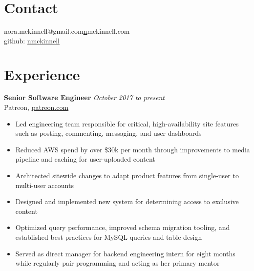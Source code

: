 \documentclass[margin,line]{resume}
\begin{document}
\begin{resume}
\section{\mysidestyle Contact}

nora.mckinnell@gmail.com\hfill \href{http://nmckinnell.com}nmckinnell.com\vspace{0mm}\\\vspace{0mm}%
\hfill github: \href{https://github.com/nmckinnell}{nmckinnell}\vspace{0mm}\\\vspace{-4mm}%
\section{\mysidestyle Experience}

\textbf{Senior Software Engineer} \hfill \textsl{October 2017 to present}\vspace{0mm}\\%
Patreon, \href{http://patreon.com}{patreon.com}\vspace{0mm}\\\vspace{-2mm}%
\begin{itemize}
\item Led engineering team responsible for critical, high-availability site features such as posting, commenting, messaging, and user dashboards
\item Reduced AWS spend by over \$30k per month through improvements to media pipeline and caching for user-uploaded content
\item Architected sitewide changes to adapt product features from single-user to multi-user accounts
\item Designed and implemented new system for determining access to exclusive content
\item Optimized query performance, improved schema migration tooling, and established best practices for MySQL queries and table design
\item Served as direct manager for backend engineering intern for eight months while regularly pair programming and acting as her primary mentor
\end{itemize}


\end{resume}
\end{document}
